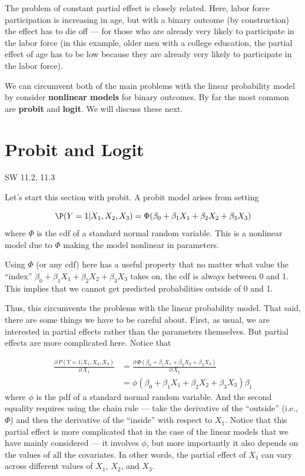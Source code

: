 \documentclass[
  letterpaper,
  DIV=11,
  numbers=noendperiod]{scrreprt}
\begin{document}
The problem of constant partial effect is closely related. Here, labor
force participation is increasing in age, but with a binary outcome (by
construction) the effect has to die off --- for those who are already
very likely to participate in the labor force (in this example, older
men with a college education, the partial effect of age has to be low
because they are already very likely to participate in the labor force).

We can circumvent both of the main problems with the linear probability
model by consider \textbf{nonlinear models} for binary outcomes. By far
the most common are \textbf{probit} and \textbf{logit}. We will discuss
these next.

\section{Probit and Logit}\label{probit-and-logit}

SW 11.2, 11.3

Let's start this section with probit. A probit model arises from setting

\[
  \P(Y=1|X_1,X_2,X_3) = \Phi(\beta_0 + \beta_1 X_1 + \beta_2 X_2 + \beta_3 X_3)
\] where \(\Phi\) is the cdf of a standard normal random variable. This
is a nonlinear model due to \(\Phi\) making the model nonlinear in
parameters.

Using \(\Phi\) (or any cdf) here has a useful property that no matter
what value the ``index''
\(\beta_0 + \beta_1 X_1 + \beta_2 X_2 + \beta_3 X_3\) takes on, the cdf
is always between 0 and 1. This implies that we cannot get predicted
probabilities outside of 0 and 1.

Thus, this circumvents the problems with the linear probability model.
That said, there are some things we have to be careful about. First, as
usual, we are interested in partial effects rather than the parameters
themselves. But partial effects are more complicated here. Notice that

\[
  \begin{aligned}
  \frac{ \partial \, P(Y=1|X_1,X_2,X_3)}{\partial \, X_1} &= \frac{\partial \, \Phi(\beta_0 + \beta_1 X_1 + \beta_2 X_2 + \beta_3 X_3)}{\partial \, X_1} \\
  &= \phi(\beta_0 + \beta_1 X_1 + \beta_2 X_2 + \beta_3 X_3) \beta_1
  \end{aligned}
\] where \(\phi\) is the pdf of a standard normal random variable. And
the second equality requires using the chain rule --- take the
derivative of the ``outside'' (i.e., \(\Phi\)) and then the derivative
of the ``inside'' with respect to \(X_1\). Notice that this partial
effect is more complicated that in the case of the linear models that we
have mainly considered --- it involves \(\phi\), but more importantly it
also depends on the values of all the covariates. In other words, the
partial effect of \(X_1\) can vary across different values of \(X_1\),
\(X_2\), and \(X_3\).
\end{document}

